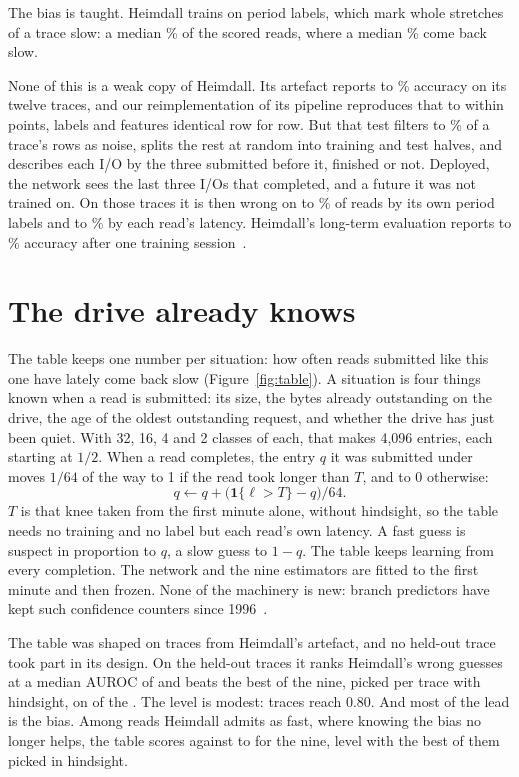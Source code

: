 \documentclass[10pt,twocolumn]{article}
\newcommand{\T}{\ensuremath{T}}
\begin{document}
The bias is taught. Heimdall trains on period labels, which mark whole stretches of a trace slow: a median \PeriodSlow\% of the scored reads, where a median \ReadsSlow\% come back slow.

None of this is a weak copy of Heimdall. Its artefact reports \ArtAccLo{} to \ArtAccHi\% accuracy on its twelve traces, and our reimplementation of its pipeline reproduces that to within \ArtAccDiff{} points, labels and features identical row for row. But that test filters \FilteredLo{} to \FilteredHi\% of a trace's rows as noise, splits the rest at random into training and test halves, and describes each I/O by the three submitted before it, finished or not. Deployed, the network sees the last three I/Os that completed, and a future it was not trained on. On those traces it is then wrong on \DevWrongPerLo{} to \DevWrongPerHi\% of reads by its own period labels and \DevWrongLo{} to \DevWrongHi\% by each read's latency. Heimdall's long-term evaluation reports \HeimAccLo{} to \HeimAccHi\% accuracy after one training session~\cite[\S7]{heimdall}.

\section{The drive already knows}
\label{sec:table}
The table keeps one number per situation: how often reads submitted like this one have lately come back slow (Figure~\ref{fig:table}). A situation is four things known when a read is submitted: its size, the bytes already outstanding on the drive, the age of the oldest outstanding request, and whether the drive has just been quiet. With 32, 16, 4 and 2 classes of each, that makes 4,096 entries, each starting at $1/2$. When a read completes, the entry $q$ it was submitted under moves $1/64$ of the way to 1 if the read took longer than \T, and to 0 otherwise:
\[ q \leftarrow q + \bigl(\mathbf{1}\{\ell>\T\}-q\bigr)/64 . \]
\T{} is that knee taken from the first minute alone, without hindsight, so the table needs no training and no label but each read's own latency. A fast guess is suspect in proportion to $q$, a slow guess to $1-q$. The table keeps learning from every completion. The network and the nine estimators are fitted to the first minute and then frozen. None of the machinery is new: branch predictors have kept such confidence counters since 1996~\cite{jacobsen}.

The table was shaped on traces from Heimdall's artefact, and no held-out trace took part in its design. On the \HeldTraces{} held-out traces it ranks Heimdall's wrong guesses at a median AUROC of \TableMed{} and beats the best of the nine, picked per trace with hindsight, on \TableAhead{} of the \HeldTraces. The level is modest: \TableEighty{} traces reach 0.80. And most of the lead is the bias. Among reads Heimdall admits as fast, where knowing the bias no longer helps, the table scores \AdmTable{} against \AdmEstLo{} to \AdmEstHi{} for the nine, level with the best of them picked in hindsight.
\end{document}
